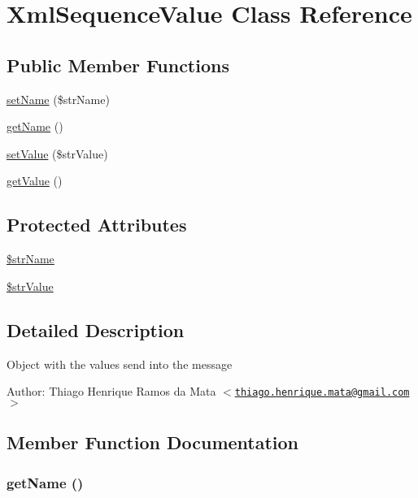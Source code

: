 \hypertarget{class_xml_sequence_value}{
\section{XmlSequenceValue Class Reference}
\label{class_xml_sequence_value}
}
\subsection*{Public Member Functions}
\begin{CompactItemize}
\item 
\hyperlink{class_xml_sequence_value_c05d9184d52b7a34210a801767bef213}{setName} (\$strName)
\item 
\hyperlink{class_xml_sequence_value_3d0963e68bb313b163a73f2803c64600}{getName} ()
\item 
\hyperlink{class_xml_sequence_value_b5d79fa8a006bc1c112844b24f3e4897}{setValue} (\$strValue)
\item 
\hyperlink{class_xml_sequence_value_c0bc18784b182c89fcfd276625aef435}{getValue} ()
\end{CompactItemize}
\subsection*{Protected Attributes}
\begin{CompactItemize}
\item 
\hyperlink{class_xml_sequence_value_90edf7538a74be8ac5ce46baaf203382}{\$strName}
\item 
\hyperlink{class_xml_sequence_value_4ca01dcd54c8197f45702984773b68a4}{\$strValue}
\end{CompactItemize}


\subsection{Detailed Description}
Object with the values send into the message \begin{Desc}
\item[Author:]Thiago Henrique Ramos da Mata $<$\href{mailto:thiago.henrique.mata@gmail.com}{\tt thiago.henrique.mata@gmail.com}$>$ \end{Desc}


\subsection{Member Function Documentation}
\hypertarget{class_xml_sequence_value_3d0963e68bb313b163a73f2803c64600}{
\subsubsection[{getName}]{\setlength{\rightskip}{0pt plus 5cm}getName ()}}
\label{class_xml_sequence_value_3d0963e68bb313b163a73f2803c64600}


